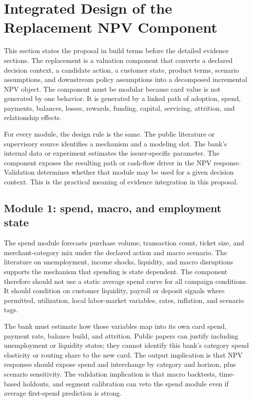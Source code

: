 \documentclass[11pt]{article}
\newcommand{\1}{\mathbf{1}}
\begin{document}
\section{Integrated Design of the Replacement NPV Component}
\label{sec:integrated-design}

This section states the proposal in build terms before the detailed evidence
sections. The replacement is a valuation component that converts a declared
decision context, a candidate action, a customer state, product terms,
scenario assumptions, and downstream policy assumptions into a decomposed
incremental NPV object. The component must be modular because card value is
not generated by one behavior. It is generated by a linked path of adoption,
spend, payments, balances, losses, rewards, funding, capital, servicing,
attrition, and relationship effects.

For every module, the design rule is the same. The public literature or
supervisory source identifies a mechanism and a modeling slot. The bank's
internal data or experiment estimates the issuer-specific parameter. The
component exposes the resulting path or cash-flow driver in the NPV response.
Validation determines whether that module may be used for a given decision
context. This is the practical meaning of evidence integration in this
proposal.

\subsection{Module 1: spend, macro, and employment state}
\label{subsec:module-spend-macro}

The spend module forecasts purchase volume, transaction count, ticket size,
and merchant-category mix under the declared action and macro scenario. The
literature on unemployment, income shocks, liquidity, and macro disruptions
supports the mechanism that spending is state dependent. The component
therefore should not use a static average spend curve for all campaign
conditions. It should condition on customer liquidity, payroll or deposit
signals where permitted, utilization, local labor-market variables, rates,
inflation, and scenario tags.

The bank must estimate how those variables map into its own card spend,
payment rate, balance build, and attrition. Public papers can justify including
unemployment or liquidity states; they cannot identify this bank's category
spend elasticity or routing share to the new card. The output implication is
that NPV responses should expose spend and interchange by category and horizon,
plus scenario sensitivity. The validation implication is that macro backtests,
time-based holdouts, and segment calibration can veto the spend module even if
average first-spend prediction is strong.
\end{document}
